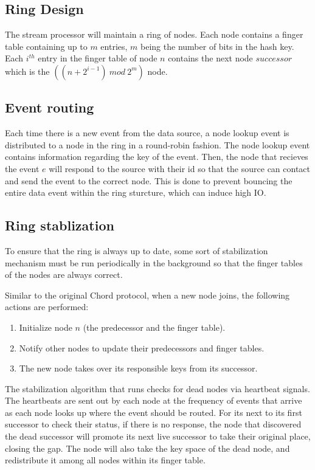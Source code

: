 \documentclass[journal]{IEEEtran}
\begin{document}
\subsection{Ring Design}
The stream processor will maintain a ring of nodes. Each node contains a finger table containing up to $m$ entries, $m$ being the number of bits in the hash key. Each $i^{th}$ entry in the finger table of node $n$ contains the next node $successor$ which is the $((n + 2 ^ {i - 1})\ mod\ 2^m)$ node.

\subsection{Event routing}
Each time there is a new event from the data source, a node lookup event is distributed to a node in the ring in a round-robin fashion. The node lookup event contains information regarding the key of the event. Then, the node that recieves the event $e$ will respond to the source with their id so that the source can contact and send the event to the correct node. This is done to prevent bouncing the entire data event within the ring sturcture, which can induce high IO.


\subsection{Ring stablization}
To ensure that the ring is always up to date, some sort of stabilization mechanism must be run periodically in the background so that the finger tables of the nodes are always correct.

Similar to the original Chord protocol, when a new node joins, the following actions are performed:
\begin{enumerate}
\item Initialize node $n$ (the predecessor and the finger table).
\item Notify other nodes to update their predecessors and finger tables.
\item The new node takes over its responsible keys from its successor.
\end{enumerate}

The stabilization algorithm that runs checks for dead nodes via heartbeat signals. The heartbeats are sent out by each node at the frequency of events that arrive as each node looks up where the event should be routed. For its next to its first successor to check their status, if there is no response, the node that discovered the dead successor will promote its next live successor to take their original place, closing the gap. The node will also take the key space of the dead node, and redistribute it among all nodes within its finger table.
\end{document}
